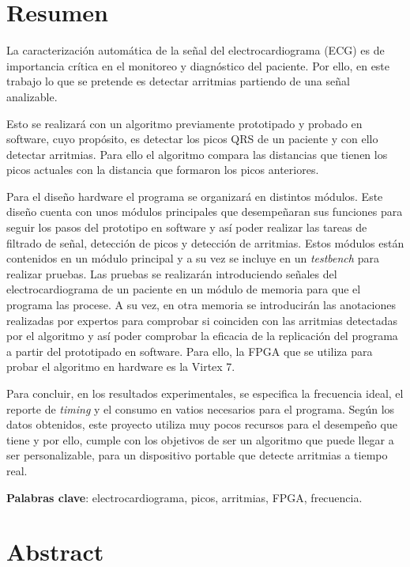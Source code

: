 \chapter*{Resumen}

La caracterización automática de la señal del electrocardiograma (ECG) es de importancia crítica en el monitoreo y diagnóstico del paciente. Por ello, en este trabajo lo que se pretende es detectar arritmias partiendo de una señal analizable. 

Esto se realizará con un algoritmo previamente prototipado y probado en software, cuyo propósito, es detectar los picos QRS de un paciente y con ello detectar arritmias. Para ello el algoritmo compara las distancias que tienen los picos actuales con la distancia que formaron los picos anteriores.

Para el diseño hardware el programa se organizará en distintos módulos. Este diseño cuenta con unos módulos principales que desempeñaran sus funciones para seguir los pasos del prototipo en software y así poder realizar las tareas de filtrado de señal, detección de picos y detección de arritmias.
Estos módulos están contenidos en un módulo principal y a su vez se incluye en un \textit{testbench} para realizar pruebas. Las pruebas se realizarán introduciendo señales del electrocardiograma de un paciente en un módulo de memoria para que el programa las procese. A su vez, en otra memoria se introducirán las anotaciones realizadas por expertos para comprobar si coinciden con las arritmias detectadas por el algoritmo y así poder comprobar la eficacia de la replicación del programa a partir del prototipado en software. Para ello, la FPGA que se utiliza para probar el algoritmo en hardware es la Virtex 7.

Para concluir, en los resultados experimentales, se especifica la frecuencia ideal, el reporte de \textit{timing} y el consumo en vatios necesarios para el programa. Según los datos obtenidos, este proyecto utiliza muy pocos recursos para el desempeño que tiene y por ello, cumple con los objetivos de ser un algoritmo que puede llegar a ser personalizable, para un dispositivo portable que detecte arritmias a tiempo real.

\noindent\textbf{Palabras clave}: electrocardiograma, picos, arritmias, FPGA, frecuencia.

\chapter*{Abstract}

